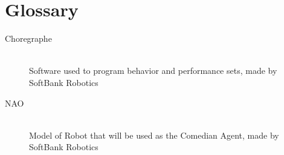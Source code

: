 \documentclass[onecolumn, draftclsnofoot,10pt, compsoc]{IEEEtran}
\begin{document}
\section{Glossary}
\begin{description}
  \item [Choregraphe] \hfill \\ Software used to program behavior and performance sets, made by SoftBank Robotics
  \item [NAO] \hfill \\ Model of Robot that will be used as the Comedian Agent, made by SoftBank Robotics
\pagebreak
\end{description}


\end{document}
